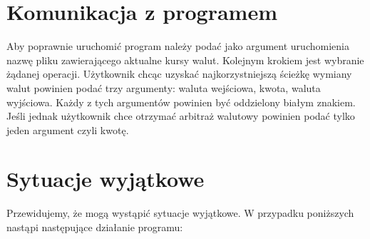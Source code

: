 \documentclass{article}
\begin{document}
\section{Komunikacja z programem}
Aby poprawnie uruchomić program należy podać jako argument uruchomienia nazwę pliku zawierającego aktualne kursy walut.
\newline\newline
Kolejnym krokiem jest wybranie żądanej operacji. Użytkownik chcąc uzyskać najkorzystniejszą ścieżkę wymiany walut powinien podać trzy argumenty: waluta wejściowa, kwota, waluta wyjściowa. Każdy z tych argumentów powinien być oddzielony białym znakiem. Jeśli jednak użytkownik chce otrzymać arbitraż walutowy powinien podać tylko jeden argument czyli kwotę.
\newline\newline



\section{Sytuacje wyjątkowe}
Przewidujemy, że mogą wystąpić sytuacje wyjątkowe. W przypadku poniższych
nastąpi następujące działanie programu:
\end{document}
